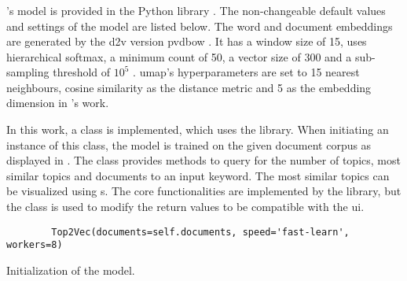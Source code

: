 \subsubsection*{\topTwovec{}}\label{subsubsec:impl-top2vec}

\citeauthor{Top2Vec2020}'s \topTwovec{} model is provided in the Python library \topTwovec{} \cite{Top2Vec2020}.
The non-changeable default values and settings of the model are listed below.
The word and document embeddings are generated by the \ac{d2v} version \ac{pvdbow} \cite{Top2Vec2020}.
It has a window size of 15, uses hierarchical softmax, a minimum count of 50, a vector size of 300 and a sub-sampling threshold of $10^5$ \cite{Top2Vec2020}.
\ac{umap}'s hyperparameters are set to 15 nearest neighbours, cosine similarity as the distance metric and 5 as the embedding dimension in \citeauthor{Top2Vec2020}'s work.

In this work, a class is implemented, which uses the \topTwovec{} library.
When initiating an instance of this class, the \topTwovec{} model is trained on the given document corpus as displayed in .
The class provides methods to query for the number of topics, 
most similar topics and documents to an input keyword.
The most similar topics can be visualized using \wordcloud{}s.
The core functionalities are implemented by the \topTwovec{} library, but the class is used to modify the return values to be compatible with the \ac{ui}.


\begin{listing}[htp]
    \begin{verbatim}
        Top2Vec(documents=self.documents, speed='fast-learn', workers=8)
    \end{verbatim}
    \caption[Initialization of the \topTwovec{} model]
    {Initialization of the \topTwovec{} model.
    }
    \label{lst:init-top2vec}
\end{listing}